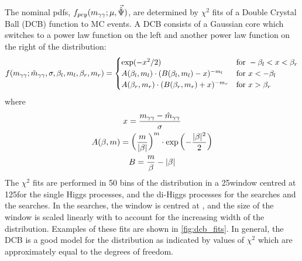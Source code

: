 The nominal pdfs, $f_{pcy}(m_{\gamma\gamma};\mu,\vec{\hat{\Psi}})$, are determined by $\chi^2$ fits of a Double Crystal Ball (DCB) function to MC events. A DCB consists of a Gaussian core which switches to a power law function on the left and another power law function on the right of the distribution:
\begin{equation}
    f(m_{\gamma\gamma}; \hat{m}_{\gamma\gamma}, \sigma, \beta_l, m_l, \beta_r, m_r) = \begin{cases}
      \exp(-x^2/2) & \text{for } -\beta_l < x < \beta_r \\
      A(\beta_l, m_l) \cdot (B(\beta_l, m_l) - x)^{-m_l} & \text{for } x < -\beta_l \\
      A(\beta_r, m_r) \cdot (B(\beta_r, m_r) + x)^{-m_r} & \text{for } x > \beta_r
    \end{cases}\label{eq:DCB}
\end{equation}
where
\begin{gather}
    x = \frac{m_{\gamma\gamma} - \hat{m}_{\gamma\gamma}}{\sigma} \\
    A(\beta, m) = \left(\frac{m}{|\beta|}\right)^m \cdot \exp\left(-\frac{|\beta|^2}{2} \right) \\
    B = \frac{m}{\beta} - |\beta|
\end{gather}
The $\chi^2$ fits are performed in 50 bins of the \mgg distribution in a 25\GeV window centred at 125\GeV for the single Higgs processes, and the di-Higgs processes for the \XHH searches and the \XYttHgg searches. In the \XYggHtt searches, the window is centred at \mY, and the size of the window is scaled linearly with \mY to account for the increasing width of the \mgg distribution. Examples of these fits are shown in \cref{fig:dcb_fits}. In general, the DCB is a good model for the \mgg distribution as indicated by values of $\chi^2$ which are approximately equal to the degrees of freedom.

